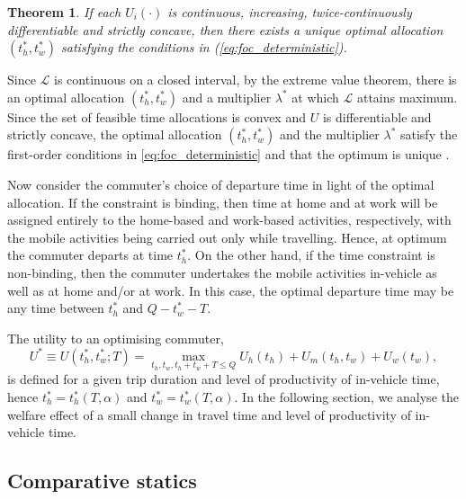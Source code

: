 \documentclass[12pt,a4paper,british]{article}
\makeatletter
\newenvironment{proof}[1][\proofname]{\par
    \normalfont\topsep6\p@\@plus6\p@\relax
    \trivlist
    \itemindent\parindent
    \item[\hskip\labelsep
          \scshape
      #1]\ignorespaces
  }{%
    \endtrivlist\@endpefalse
  }
\providecommand{\proofname}{Proof}
\newtheorem{theorem}{Theorem}[section]
\makeatother
\begin{document}
\begin{theorem}
\label{thm:optimum_det}
If each $U_{i}\left(\cdot\right)$ is continuous, increasing, twice-continuously differentiable and strictly concave, then there exists a unique optimal allocation $\left( t_{h}^{\ast}, t_{w}^{\ast} \right)$ satisfying the conditions in (\ref{eq:foc_deterministic}).
\end{theorem}

\begin{proof}
Since $\mathcal{L}$ is continuous on a closed interval, by the extreme value theorem, there is an optimal allocation $\left(t_{h}^{\ast},t_{w}^{\ast}\right)$ and a multiplier $\lambda^{\ast}$ at which $\mathcal{L}$ attains maximum. Since the set of feasible time allocations is convex and $U$ is differentiable and strictly concave, the optimal allocation  $\left(t_{h}^{\ast},t_{w}^{\ast}\right)$ and the multiplier $\lambda^{\ast} $ satisfy the first-order conditions in \eqref{eq:foc_deterministic} and that the optimum is unique \citep[Theorem 1.19 and Theorem 1.20 in][]{delaFuente2000MathematicalMethodsModels}.
\end{proof}

Now consider the commuter's choice of departure time in light of the optimal allocation. If the constraint is binding, then time at home and at work will be assigned entirely to the home-based and work-based activities, respectively, with the mobile activities being carried out only while travelling. Hence, at optimum the commuter departs at time $t_{h}^{\ast}$. On the other hand, if the time constraint is non-binding, then the commuter undertakes the mobile activities in-vehicle as well as at home and/or at work. In this case, the optimal departure time may be any time between $t_{h}^{\ast}$ and $Q-t_{w}^{\ast}-T$. 

The utility to an optimising commuter,%
\begin{equation}
U^{\ast}\equiv U\left(t_{h}^{\ast},t_{w}^{\ast};T\right)=\max_{t_{h},t_{w},t_{h}+t_{w}+T\leq Q}U_{h}\left(t_{h}\right)+U_{m}\left(t_{h}, t_{w}\right)+U_{w}\left(t_{w}\right),
\label{eq:UStarDet}
\end{equation}
is defined for a given trip duration and level of productivity of in-vehicle time, hence $t_h^{\ast}= t_h^{\ast} \left(T, \alpha \right)$ and $t_w^{\ast} = t_w^{\ast} \left(T, \alpha \right)$. In the following section, we analyse the welfare effect of a small change in travel time and level of productivity of in-vehicle time.


\subsection{Comparative statics}
\end{document}
